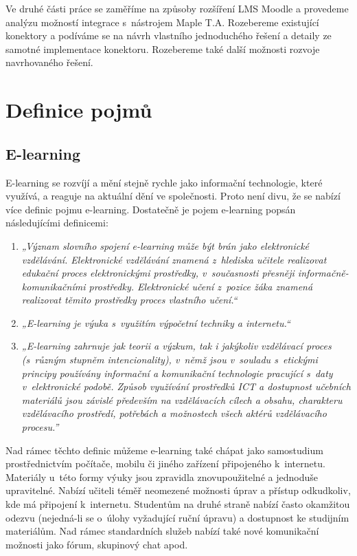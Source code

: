 \documentclass[
print,
  11pt,
  table,   
  nolof,    
  nolot,
  oneside,
  draft
]{fithesis3}
\begin{document}
Ve druhé části práce se zaměříme na způsoby rozšíření LMS Moodle a provedeme analýzu možností integrace s~nástrojem Maple T.A. Rozebereme existující konektory a podíváme se na návrh vlastního jednoduchého řešení a detaily ze samotné implementace konektoru. Rozebereme také další možnosti rozvoje navrhovaného řešení.


\chapter{Definice pojmů}
	\section{E-learning}
E-learning se rozvíjí a mění stejně rychle jako informační technologie, které využívá, a reaguje na aktuální dění ve společnosti. Proto není divu, že se nabízí více definic pojmu e-learning. Dostatečně je pojem e-learning popsán následujícími definicemi:

\begin{enumerate}
  \item \emph{„Význam slovního spojení e-learning může být brán jako elektronic\-ké vzdělávání. Elektronické vzdělávání znamená z~hlediska učitele realizovat edukační proces elektronickými prostředky, v~současnosti přesněji informačně-komunikačními prostředky. Elektronické učení z~pozice žáka znamená realizovat těmito prostředky proces vlastního učení.“} \cite{ockajova}
  \item \emph{„E-learning je výuka s~využitím výpočetní techniky a internetu.“} \cite{korviny}
  \item \emph{„E-learning zahrnuje jak teorii a výzkum, tak i jakýkoliv vzdělávací proces (s~různým stupněm intencionality), v~němž jsou v~souladu s~etickými principy používány informační a komunikační technologie pracující s~daty v~elektronické podobě. Způsob využívání prostředků ICT a dostupnost učebních materiálů jsou závislé především na vzdělávacích cílech a obsahu, charakteru vzdělávacího prostředí, potřebách a možnostech všech aktérů vzdělávacího procesu.” }\cite{zounek}

\end{enumerate}


Nad rámec těchto definic můžeme e-learning také chápat jako samostudium prostřednictvím počítače, mobilu či jiného zařízení připojeného k~internetu. Materiály u~této formy výuky jsou zpravidla znovupoužitelné a jednoduše upravitelné. Nabízí učiteli téměř neomezené možnosti úprav a přístup odkudkoliv, kde má připojení k~internetu. Studentům na druhé straně nabízí často okamžitou odezvu (nejedná-li se o~úlohy vyžadující ruční úpra\-vu) a dostupnost ke studijním materiálům. Nad rámec standardních služeb nabízí také nové komunikační možnosti jako fórum, skupinový chat apod.
\end{document}
